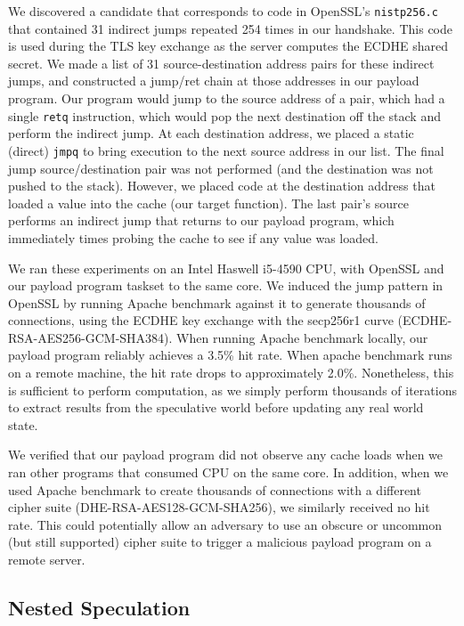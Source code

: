 We discovered a candidate that corresponds to code in OpenSSL's
\texttt{nistp256.c} that contained 31 indirect jumps repeated 254 times in our
handshake. This code is used during the TLS key exchange as the server computes
the ECDHE shared secret. We made a list of 31 source-destination address pairs
for these indirect jumps, and constructed a jump/ret chain at those addresses in
our payload program. Our program would jump to the source address of a pair,
which had a single \texttt{retq} instruction, which would pop the next
destination off the stack and perform the indirect jump. At each destination
address, we placed a static (direct) \texttt{jmpq} to bring execution to the
next source address in our list. The final jump source/destination pair was not
performed (and the destination was not pushed to the stack). However, we placed
code at the destination address that loaded a value into the cache (our target
function). The last pair's source performs an indirect jump that returns to our
payload program, which immediately times probing the cache to see if any value was
loaded.

We ran these experiments on an Intel Haswell
i5-4590 CPU, with OpenSSL and our payload program taskset to the same core.
We induced the jump pattern in OpenSSL by running Apache benchmark against it to
generate thousands of connections, using the ECDHE key exchange with the
secp256r1 curve (ECDHE-RSA-AES256-GCM-SHA384). When running Apache benchmark locally, our payload program
reliably achieves a 3.5\% hit rate. When apache benchmark runs on a remote
machine, the hit rate drops to approximately 2.0\%. Nonetheless, this is
sufficient to perform computation, as we simply perform thousands of iterations
to extract results from the speculative world before updating any real world state.

We verified that our payload program did not observe any cache loads when we ran
other programs that consumed CPU on the same core. In addition, when we used
Apache benchmark to create thousands of connections with a different cipher
suite (DHE-RSA-AES128-GCM-SHA256), we similarly received no hit rate. This
could potentially allow an adversary to use an obscure or uncommon (but still
supported) cipher suite to trigger a malicious payload program on a remote server.



\subsection{Nested Speculation}
\label{subsec:nested-spec}

